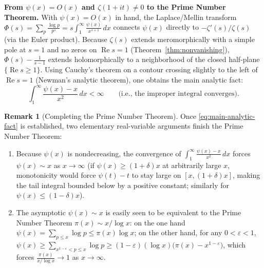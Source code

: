 \documentclass[11pt]{article}
\theoremstyle{plain}
\theoremstyle{definition}
\theoremstyle{boldremark}
\newtheorem*{remark}{Remark}
\theoremstyle{remark}
\numberwithin{equation}{section}
\DeclareMathOperator{\Real}{Re}
\begin{document}
\textbf{From $\psi(x)=O(x)$ and $\zeta(1+it)\neq 0$ to the Prime Number Theorem.}
With $\psi(x)=O(x)$ in hand, the Laplace/Mellin transform
$\Phi(s)=\sum_{p}\frac{\log p}{p^s}=s\int_1^{\infty}\frac{\psi(x)}{x^{s+1}}\,dx$
connects $\psi(x)$ directly to $-\zeta'(s)/\zeta(s)$ (via the Euler
product). Because $\zeta(s)$ extends meromorphically with a simple pole at
$s=1$ and no zeros on $\Real s = 1$ (Theorem~\ref{thm:nonvanishing}),
$\Phi(s)-\frac{1}{s-1}$ extends holomorphically to a neighborhood of the
closed half-plane $\{\Real s \geq 1\}$. Using Cauchy's theorem on a
contour crossing slightly to the left of $\Real s = 1$ (Newman's analytic
theorem), one obtains the main analytic fact:
\begin{equation}\label{eq:main-analytic-fact}
 \boxed{\displaystyle
  \int_1^{\infty}\frac{\psi(x)-x}{x^2}\,dx < \infty}
 \qquad\text{(i.e., the improper integral converges).}
\end{equation}

\begin{remark}[Completing the Prime Number Theorem]
Once \eqref{eq:main-analytic-fact} is established, two elementary
real-variable arguments finish the Prime Number Theorem:
\begin{enumerate}[label=\textup{(\arabic*)}]
 \item Because $\psi(x)$ is nondecreasing, the convergence of
       $\int_1^{\infty}\frac{\psi(x)-x}{x^2}\,dx$ forces $\psi(x)\sim x$
       as $x\to\infty$ (if $\psi(x)\geq(1+\delta)x$ at arbitrarily large
       $x$, monotonicity would force $\psi(t)-t$ to stay large on
       $[x,(1+\delta)x]$, making the tail integral bounded below by a
       positive constant; similarly for $\psi(x)\leq(1-\delta)x$).
 \item The asymptotic $\psi(x)\sim x$ is easily seen to be equivalent to
       the Prime Number Theorem $\pi(x)\sim x/\log x$: on the one hand
       $\psi(x)=\sum_{p\leq x}\log p\leq\pi(x)\log x$; on the other hand,
       for any $0<\varepsilon<1$,
       $\psi(x)\geq\sum_{x^{1-\varepsilon}<p\leq x}\log p\geq(1-\varepsilon)(\log x)\bigl(\pi(x)-x^{1-\varepsilon}\bigr)$,
       which forces $\frac{\pi(x)}{x/\log x}\to 1$ as $x\to\infty$.
\end{enumerate}
\end{remark}
\end{document}
